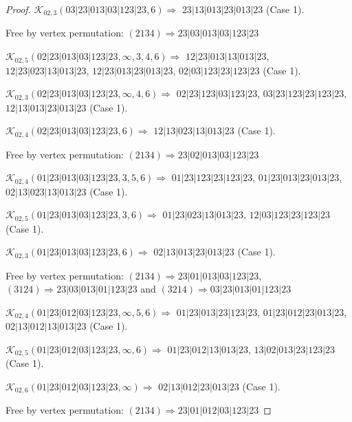 \documentclass[12pt]{article}
\theoremstyle{plain}
\theoremstyle{definition}
\theoremstyle{remark}
\newcommand{\fancy}[1]{\mathcal{#1}}
\def\K{\fancy{K}}
\begin{document}
\begin{proof}
	$\K_{02,3}(03|23|013|03|123|23,6)\Rightarrow $ $23|13|013|23|013|23$ (Case 1).
	
	
	
	Free by vertex permutation: $(2 1 3 4)\Rightarrow 23|03|013|03|123|23$
	
	
	
	\bigskip
	
	$\K_{02,5}(02|23|013|03|123|23,\infty,3, 4, 6)\Rightarrow $ $12|23|013|13|013|23$, $12|23|023|13|013|23$, $12|23|013|23|013|23$, $02|03|123|23|123|23$ (Case 1).
	
	$\K_{02,3}(02|23|013|03|123|23,\infty,4, 6)\Rightarrow $ $02|23|123|03|123|23$, $03|23|123|23|123|23$, $12|13|013|23|013|23$ (Case 1).
	
	$\K_{02,4}(02|23|013|03|123|23,6)\Rightarrow $ $12|13|023|13|013|23$ (Case 1).
	
	
	
	Free by vertex permutation: $(2 1 3 4)\Rightarrow 23|02|013|03|123|23$
	
	
	
	\bigskip
	
	$\K_{02,4}(01|23|013|03|123|23,3, 5, 6)\Rightarrow $ $01|23|123|23|123|23$, $01|23|013|23|013|23$, $02|13|023|13|013|23$ (Case 1).
	
	$\K_{02,5}(01|23|013|03|123|23,3, 6)\Rightarrow $ $01|23|023|13|013|23$, $12|03|123|23|123|23$ (Case 1).
	
	$\K_{02,3}(01|23|013|03|123|23,6)\Rightarrow $ $02|13|013|23|013|23$ (Case 1).
	
	
	
	Free by vertex permutation: $(2 1 3 4)\Rightarrow 23|01|013|03|123|23$, $(3 1 2 4)\Rightarrow 23|03|013|01|123|23$ and $(3 2 1 4)\Rightarrow 03|23|013|01|123|23$
	
	
	
	\bigskip
	
	$\K_{02,4}(01|23|012|03|123|23,\infty,5, 6)\Rightarrow $ $01|23|013|23|123|23$, $01|23|012|23|013|23$, $02|13|012|13|013|23$ (Case 1).
	
	$\K_{02,5}(01|23|012|03|123|23,\infty,6)\Rightarrow $ $01|23|012|13|013|23$, $13|02|013|23|123|23$ (Case 1).
	
	$\K_{02,6}(01|23|012|03|123|23,\infty)\Rightarrow $ $02|13|012|23|013|23$ (Case 1).
	
	
	
	Free by vertex permutation: $(2 1 3 4)\Rightarrow 23|01|012|03|123|23$
	
	
	
	\bigskip
	

\end{proof}
\end{document}
